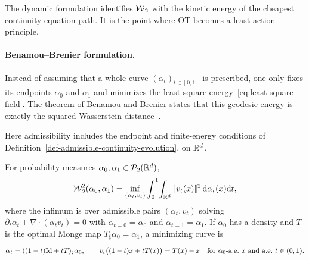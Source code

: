 The dynamic formulation identifies $\operatorname{\mathcal{W}}_2$ with the kinetic energy of the cheapest continuity-equation path. It is the point where OT becomes a least-action principle.

\paragraph{Benamou--Brenier formulation.}

Instead of assuming that a whole curve $(\alpha_t)_{t\in[0,1]}$ is prescribed, one only fixes its endpoints $\alpha_0$ and $\alpha_1$ and minimizes the least-square energy~\eqref{eq:least-square-field}. The theorem of Benamou and Brenier states that this geodesic energy is exactly the squared Wasserstein distance~\cite{benamou2000computational}.

Here admissibility includes the endpoint and finite-energy conditions of Definition~\ref{def-admissible-continuity-evolution}, on $\mathbb{R}^d$.

\begin{thm}\label{thm-benamou-brenier}\label{def-benamou-brenier-action}
	For probability measures $\alpha_0,\alpha_1\in\mathcal{P}_2(\mathbb{R}^d)$,
	\begin{equation}\label{eq:benamou-brenier}
	\operatorname{\mathcal{W}}_2^2(\alpha_0,\alpha_1)
	=
	\inf_{(\alpha_t,v_t)}
	\int_0^1\!\int_{\mathbb{R}^d}|\!| v_t(x) |\!|^2\,\mathrm{d}\alpha_t(x)\mathrm{d} t,
	\end{equation}
	where the infimum is over admissible pairs $(\alpha_t,v_t)$ solving $\partial_t\alpha_t+\nabla\!\cdot(\alpha_t v_t)=0$ with $\alpha_{t=0}=\alpha_0$ and $\alpha_{t=1}=\alpha_1$. If $\alpha_0$ has a density and $T$ is the optimal Monge map $T_\sharp\alpha_0=\alpha_1$, a minimizing curve is
	\begin{equation}\label{eq:static-to-dynamic}
		\alpha_t=((1-t)\Id+tT)_\sharp\alpha_0,
		\qquad
		v_t\big((1-t)x+tT(x)\big)=T(x)-x
		\quad\text{for $\alpha_0$-a.e.\ $x$ and a.e.\ $t\in(0,1)$}.
	\end{equation}
\end{thm}

